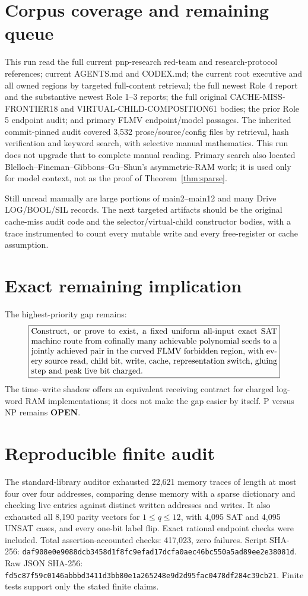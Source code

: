 \documentclass[11pt]{article}
\newcommand{\OPEN}{\textbf{OPEN}}
\begin{document}
\section{Corpus coverage and remaining queue}
This run read the full current pnp-research red-team and research-protocol
references; current AGENTS.md and CODEX.md; the current root executive and
all owned regions by targeted full-content retrieval; the full newest Role 4
report and the substantive newest Role 1--3 reports; the full original
CACHE-MISS-FRONTIER18 and VIRTUAL-CHILD-COMPOSITION61 bodies; the prior Role 5
endpoint audit; and primary FLMV endpoint/model passages.  The inherited
commit-pinned audit covered 3,532 prose/source/config files by retrieval,
hash verification and keyword search, with selective manual mathematics.
This run does not upgrade that to complete manual reading.  Primary search
also located Blelloch--Fineman--Gibbons--Gu--Shun's asymmetric-RAM work; it is
used only for model context, not as the proof of Theorem~\ref{thm:sparse}.

Still unread manually are large portions of main2--main12 and many Drive
LOG/BOOL/SIL records.  The next targeted artifacts should be the original
cache-miss audit code and the selector/virtual-child constructor bodies, with
a trace instrumented to count every mutable write and every free-register or
cache assumption.

\section{Exact remaining implication}
The highest-priority gap remains:
\[
\boxed{\begin{minipage}{.86\linewidth}
Construct, or prove to exist, a fixed uniform all-input exact SAT machine
route from cofinally many achievable polynomial seeds to a jointly achieved
pair in the curved FLMV forbidden region, with every source read, child bit,
write, cache, representation switch, gluing step and peak live bit charged.
\end{minipage}}
\]
The time--write shadow offers an equivalent receiving contract for charged
log-word RAM implementations; it does not make the gap easier by itself.
P versus NP remains \OPEN.

\section{Reproducible finite audit}
The standard-library auditor exhausted 22,621 memory traces of length at most
four over four addresses, comparing dense memory with a sparse dictionary and
checking live entries against distinct written addresses and writes.  It also
exhausted all 8,190 parity vectors for $1\le q\le12$, with 4,095 SAT and 4,095
UNSAT cases, and every one-bit label flip.  Exact rational endpoint checks
were included.  Total assertion-accounted checks: 417,023, zero failures.
Script SHA-256:
\texttt{daf908e0e9088dcb3458d1f8fc9efad17dcfa0aec46bc550a5ad89ee2e38081d}.
Raw JSON SHA-256:
\texttt{fd5c87f59c0146abbbd3411d3bb80e1a265248e9d2d95fac0478df284c39cb21}.
Finite tests support only the stated finite claims.
\end{document}
